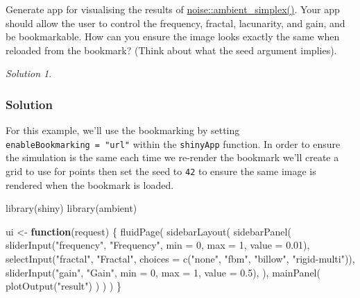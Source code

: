 \documentclass[
]{book}
\newenvironment{Shaded}{\begin{snugshade}}{\end{snugshade}}
\newcommand{\AttributeTok}[1]{\textcolor[rgb]{0.77,0.63,0.00}{#1}}
\newcommand{\ControlFlowTok}[1]{\textcolor[rgb]{0.13,0.29,0.53}{\textbf{#1}}}
\newcommand{\DecValTok}[1]{\textcolor[rgb]{0.00,0.00,0.81}{#1}}
\newcommand{\FloatTok}[1]{\textcolor[rgb]{0.00,0.00,0.81}{#1}}
\newcommand{\FunctionTok}[1]{\textcolor[rgb]{0.00,0.00,0.00}{#1}}
\newcommand{\NormalTok}[1]{#1}
\newcommand{\OtherTok}[1]{\textcolor[rgb]{0.56,0.35,0.01}{#1}}
\newcommand{\StringTok}[1]{\textcolor[rgb]{0.31,0.60,0.02}{#1}}
\theoremstyle{definition}
\theoremstyle{definition}
\theoremstyle{definition}
\theoremstyle{definition}
\theoremstyle{remark}
\newtheorem*{solution}{Solution}
\begin{document}
Generate app for visualising the results of \href{https://ambient.data-imaginist.com/reference/noise_simplex.html}{noise::ambient\_simplex()}. Your app should allow the user to control the frequency, fractal, lacunarity, and gain, and be bookmarkable. How can you ensure the image looks exactly the same when reloaded from the bookmark? (Think about what the seed argument implies).

\begin{solution}
\leavevmode

\hypertarget{solution-41}{%
\subsubsection*{Solution}\label{solution-41}}

For this example, we'll use the bookmarking by setting \texttt{enableBookmarking\ =\ "url"} within the \texttt{shinyApp} function. In order to ensure the simulation is the same each time we re-render the bookmark we'll create a grid to use for points then set the seed to \texttt{42} to ensure the same image is rendered when the bookmark is loaded.

\begin{Shaded}
\begin{Highlighting}[]
\FunctionTok{library}\NormalTok{(shiny)}
\FunctionTok{library}\NormalTok{(ambient)}

\NormalTok{ui }\OtherTok{\textless{}{-}} \ControlFlowTok{function}\NormalTok{(request) \{}
    \FunctionTok{fluidPage}\NormalTok{(}
    \FunctionTok{sidebarLayout}\NormalTok{(}
        \FunctionTok{sidebarPanel}\NormalTok{(}
            \FunctionTok{sliderInput}\NormalTok{(}\StringTok{"frequency"}\NormalTok{, }\StringTok{"Frequency"}\NormalTok{, }\AttributeTok{min =} \DecValTok{0}\NormalTok{, }\AttributeTok{max =} \DecValTok{1}\NormalTok{, }\AttributeTok{value =} \FloatTok{0.01}\NormalTok{),}
            \FunctionTok{selectInput}\NormalTok{(}\StringTok{"fractal"}\NormalTok{, }\StringTok{"Fractal"}\NormalTok{, }\AttributeTok{choices =} \FunctionTok{c}\NormalTok{(}\StringTok{"none"}\NormalTok{, }\StringTok{"fbm"}\NormalTok{, }\StringTok{"billow"}\NormalTok{, }\StringTok{"rigid{-}multi"}\NormalTok{)),}
            \FunctionTok{sliderInput}\NormalTok{(}\StringTok{"gain"}\NormalTok{, }\StringTok{"Gain"}\NormalTok{, }\AttributeTok{min =} \DecValTok{0}\NormalTok{, }\AttributeTok{max =} \DecValTok{1}\NormalTok{, }\AttributeTok{value =} \FloatTok{0.5}\NormalTok{),}
\NormalTok{        ),}
        \FunctionTok{mainPanel}\NormalTok{(}
            \FunctionTok{plotOutput}\NormalTok{(}\StringTok{"result"}\NormalTok{)}
\NormalTok{        )}
\NormalTok{    )}
\NormalTok{  )}
\NormalTok{\}}



\end{Highlighting}
\end{Shaded}
\end{solution}
\end{document}
